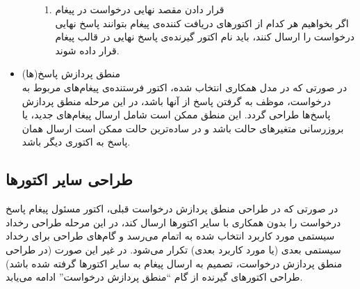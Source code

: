 \begin{itemize}
\begin{itemize}
\begin{enumerate}
\item قرار دادن مقصد نهایی درخواست در پیغام\\
اگر بخواهیم هر کدام از اکتورهای دریافت کننده‌ی پیغام بتوانند پاسخ نهایی درخواست را ارسال کنند، باید نام اکتور گیرنده‌ی پاسخ نهایی در قالب پیغام قرار داده شوند.
\end{enumerate}
\end{itemize}
\item منطق پردازش پاسخ(ها)\\
در صورتی که در مدل همکاری انتخاب شده، اکتور فرستنده‌ی پیغام‌های مربوط به درخواست، موظف به گرفتن پاسخ از آنها باشد، در این مرحله منطق پردازش پاسخ‌ها طراحی گردد. این منطق ممکن است شامل ارسال پیغام‌های جدید، یا بروزرسانی متغیرهای حالت باشد و در ساده‌ترین حالت ممکن است ارسال همان پاسخ به اکتوری دیگر باشد.
\end{itemize}

\subsection{طراحی سایر اکتورها}
در صورتی که در طراحی منطق پردازش درخواست قبلی، اکتور مسئول پیغام پاسخ درخواست را بدون همکاری با سایر اکتورها ارسال کند، در این مرحله طراحی رخداد سیستمی مورد کاربرد انتخاب شده به اتمام می‌رسد و گام‌های طراحی برای رخداد سیستمی بعدی (یا مورد کاربرد بعدی) تکرار می‌شود. در غیر این صورت 
(در طراحی منطق پردازش درخواست، تصمیم به ارسال پیغام به سایر اکتورها گرفته شده باشد) طراحی اکتورهای گیرنده از گام ``منطق پردازش درخواست'' ادامه می‌یابد.




